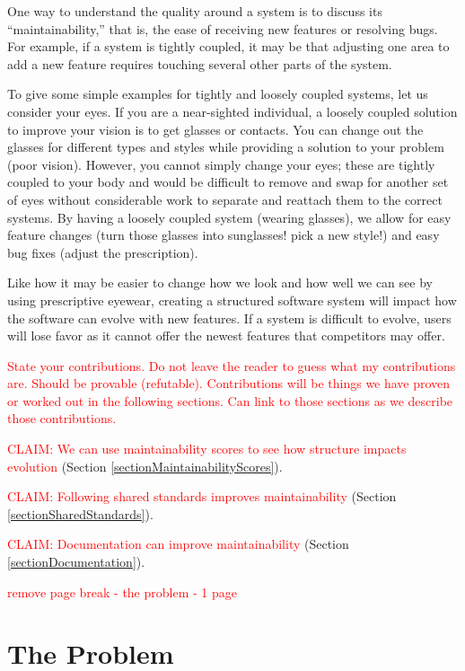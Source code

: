 \documentclass[12pt,conference]{IEEEtran}
\newcommand\todo[1]{\textcolor{red}{#1}}
\begin{document}
One way to understand the quality around a system is to discuss its ``maintainability,'' that is, the ease of receiving new features or resolving bugs. For example, if a system is tightly coupled, it may be that adjusting one area to add a new feature requires touching several other parts of the system.

To give some simple examples for tightly and loosely coupled systems, let us consider your eyes. If you are a near-sighted individual, a loosely coupled solution to improve your vision is to get glasses or contacts. You can change out the glasses for different types and styles while providing a solution to your problem (poor vision). However, you cannot simply change your eyes; these are tightly coupled to your body and would be difficult to remove and swap for another set of eyes without considerable work to separate and reattach them to the correct systems. By having a loosely coupled system (wearing glasses), we allow for easy feature changes (turn those glasses into sunglasses! pick a new style!) and easy bug fixes (adjust the prescription).

Like how it may be easier to change how we look and how well we can see by using prescriptive eyewear, creating a structured software system will impact how the software can evolve with new features. If a system is difficult to evolve, users will lose favor as it cannot offer the newest features that competitors may offer.

\todo{State your contributions. Do not leave the reader to guess what my contributions are. Should be provable (refutable). Contributions will be things we have proven or worked out in the following sections. Can link to those sections as we describe those contributions.}

\todo{CLAIM: We can use maintainability scores to see how structure impacts evolution} (Section \ref{sectionMaintainabilityScores}).

\todo{CLAIM: Following shared standards improves maintainability} (Section \ref{sectionSharedStandards}).

\todo{CLAIM: Documentation can improve maintainability} (Section \ref{sectionDocumentation}).

\newpage \todo{remove page break - the problem - 1 page}

\section{The Problem}
\end{document}
